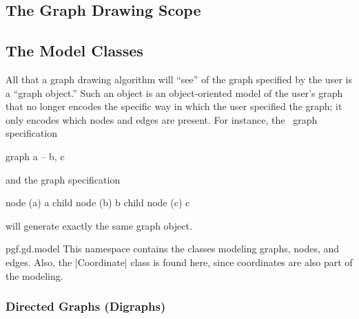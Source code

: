 \subsection{The Graph Drawing Scope}

\label{section-gd-gd-scope}




\subsection{The Model Classes}

\label{section-gd-models}

All that a graph drawing algorithm will ``see'' of the graph specified
by the user is a ``graph object.'' Such an object is an
object-oriented model of the user's graph that no longer encodes the
specific way in which the user specified the graph; it only encodes
which nodes and edges are present. For instance, the \tikzname\ graph
specification 
\begin{codeexample}
graph { a -- {b, c} }
\end{codeexample}
\noindent and the graph specification
\begin{codeexample}
node (a) { a }
child { node (b) {b} }
child { node (c) {c} }
\end{codeexample}
will generate exactly the same graph object.

\begin{luanamespace}{pgf.gd.}{model}
  This namespace contains the classes modeling graphs,
  nodes, and edges. Also, the |Coordinate| class is found here, since
  coordinates are also part of the modeling.  
\end{luanamespace}


\subsubsection{Directed Graphs (Digraphs)}

